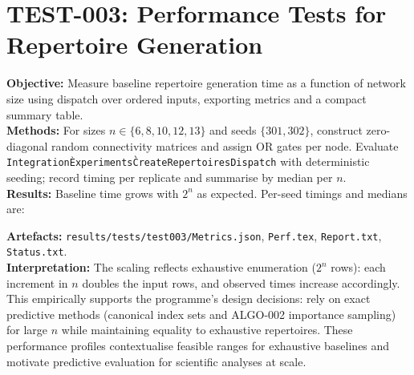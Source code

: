 \documentclass[11pt]{article}
\begin{document}
\section{TEST-003: Performance Tests for Repertoire Generation}
\textbf{Objective:} Measure baseline repertoire generation time as a function of network size using dispatch over ordered inputs, exporting metrics and a compact summary table.\\
\textbf{Methods:} For sizes $n\in\{6,8,10,12,13\}$ and seeds $\{301,302\}$, construct zero-diagonal random connectivity matrices and assign OR gates per node. Evaluate \texttt{Integration\`Experiments\`CreateRepertoiresDispatch} with deterministic seeding; record timing per replicate and summarise by median per $n$.\\
\textbf{Results:} Baseline time grows with $2^n$ as expected. Per-seed timings and medians are:\\
\begin{center}
\end{center}
\medskip
\begin{center}
\end{center}
\textbf{Artefacts:} \texttt{results/tests/test003/Metrics.json}, \texttt{Perf.tex}, \texttt{Report.txt}, \texttt{Status.txt}.\\
\textbf{Interpretation:} The scaling reflects exhaustive enumeration ($2^n$ rows): each increment in $n$ doubles the input rows, and observed times increase accordingly. This empirically supports the programme’s design decisions: rely on exact predictive methods (canonical index sets and ALGO-002 importance sampling) for large $n$ while maintaining equality to exhaustive repertoires. These performance profiles contextualise feasible ranges for exhaustive baselines and motivate predictive evaluation for scientific analyses at scale.
\end{document}
